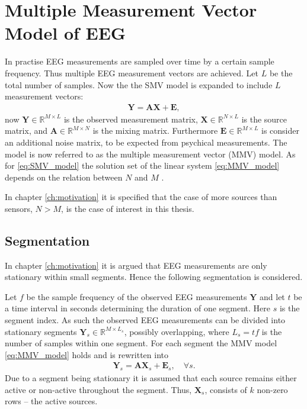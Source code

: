 \section{Multiple Measurement Vector Model of EEG}\label{sec:MMV}
In practise EEG measurements are sampled over time by a certain sample frequency. 
Thus multiple EEG measurement vectors are achieved.
Let $L$ be the total number of samples. Now the  
the SMV model is expanded to include $L$ measurement vectors:
\begin{align}\label{eq:MMV_model}
\mathbf{Y} = \mathbf{AX}+\textbf{E},
\end{align}
now $\mathbf{Y} \in \mathbb{R}^{M \times L}$ is the observed measurement matrix, $\mathbf{X} \in \mathbb{R}^{N \times L}$ is the source matrix, and $\mathbf{A} \in \mathbb{R}^{M \times N}$ is the mixing matrix. 
Furthermore $\textbf{E} \in \mathbb{R}^{M \times L}$ is consider an additional noise matrix, to be expected from psychical measurements.  
The model is now referred to as the multiple measurement vector (MMV) model.
As for \eqref{eq:SMV_model} the solution set of the linear system \eqref{eq:MMV_model} depends on the relation between $N$ and $M$ \cite[p. 42]{CS}. 

In chapter \ref{ch:motivation} it is specified that the case of more sources than sensors, $N>M$, is the case of interest in this thesis.  

\subsection{Segmentation}\label{seg_segmentation}
In chapter \ref{ch:motivation} it is argued that EEG measurements are only stationary within small segments. 
Hence the following segmentation is considered.

Let $f$ be the sample frequency of the observed EEG measurements $\mathbf{Y}$ and let $t$ be a time interval in seconds determining the duration of one segment. 
Here $s$ is the segment index. 
As such the observed EEG measurements can be divided into stationary segments  $\mathbf{Y}_s \in \mathbb{R}^{M \times L_{s}}$, possibly overlapping, where $L_s = tf$ is the number of samples within one segment. 
For each segment the MMV model \eqref{eq:MMV_model} holds and is rewritten into
\begin{align}\label{eq:MMV_seg}
\mathbf{Y}_s = \mathbf{AX}_s + \textbf{E}_s, \quad \forall s.
\end{align}
Due to a segment being stationary it is assumed that each source remains either active or non-active throughout the segment.
Thus, $\mathbf{X}_s$, consists of $k$ non-zero rows -- the active sources.

